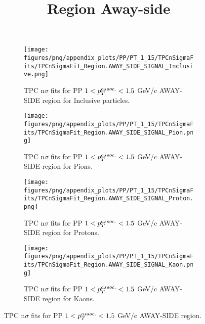             \begin{figure}[H]
                \title{Region Away-side}
                \begin{subfigure}[b]{0.5\textwidth}
                    \centering
                    \texttt{[image: figures/png/appendix\_plots/PP/PT\_1\_15/TPCnSigmaFits/TPCnSigmaFit\_Region.AWAY\_SIDE\_SIGNAL\_Inclusive.png]}
                    \caption{TPC n$\sigma$ fits for PP $1 < \pTassoc < 1.5$ GeV/c AWAY-SIDE region for Inclusive particles.}
                    \label{fig:appendix_PP_$1 < \pTassoc < 1.5$ GeV/c_AWAY_SIDE_SIGNAL_Inclusive}
                \end{subfigure}
                \begin{subfigure}[b]{0.5\textwidth}
                    \centering
                    \texttt{[image: figures/png/appendix\_plots/PP/PT\_1\_15/TPCnSigmaFits/TPCnSigmaFit\_Region.AWAY\_SIDE\_SIGNAL\_Pion.png]}
                    \caption{TPC n$\sigma$ fits for PP $1 < \pTassoc < 1.5$ GeV/c AWAY-SIDE region for Pions.}
                    \label{fig:appendix_PP_$1 < \pTassoc < 1.5$ GeV/c_AWAY_SIDE_SIGNAL_Pion}
                \end{subfigure}
                \begin{subfigure}[b]{0.5\textwidth}
                    \centering
                    \texttt{[image: figures/png/appendix\_plots/PP/PT\_1\_15/TPCnSigmaFits/TPCnSigmaFit\_Region.AWAY\_SIDE\_SIGNAL\_Proton.png]}
                    \caption{TPC n$\sigma$ fits for PP $1 < \pTassoc < 1.5$ GeV/c AWAY-SIDE region for Protons.}
                    \label{fig:appendix_PP_$1 < \pTassoc < 1.5$ GeV/c_AWAY_SIDE_SIGNAL_Proton}
                \end{subfigure}
                \begin{subfigure}[b]{0.5\textwidth}
                    \centering
                    \texttt{[image: figures/png/appendix\_plots/PP/PT\_1\_15/TPCnSigmaFits/TPCnSigmaFit\_Region.AWAY\_SIDE\_SIGNAL\_Kaon.png]}
                    \caption{TPC n$\sigma$ fits for PP $1 < \pTassoc < 1.5$ GeV/c AWAY-SIDE region for Kaons.}
                    \label{fig:appendix_PP_$1 < \pTassoc < 1.5$ GeV/c_AWAY_SIDE_SIGNAL_Kaon}
                \end{subfigure}
                \caption{TPC n$\sigma$ fits for PP $1 < \pTassoc < 1.5$ GeV/c AWAY-SIDE region.}
                \label{fig:appendix_PP_$1 < \pTassoc < 1.5$ GeV/c_AWAY_SIDE_SIGNAL}
            \end{figure}
